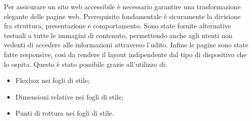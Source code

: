 Per assicurare un sito web accessibile è necessario garantire una trasformazione elegante delle pagine web. Prerequisito fondamentale è sicuramente la divisione fra struttura, presentazione e comportamento. Sono state fornite alternative testuali a tutte le immagini di contenuto, permettendo anche agli utenti non vedenti di accedere alle informazioni attraverso l'udito. 
Infine le pagine sono state fatte responsive, così da rendere il layout indipendente dal tipo di dispositivo che lo ospita. Questo è stato possibile grazie all'utilizzo di:
\begin{itemize}
\item Flexbox nei fogli di stile;
\item Dimensioni relative nei fogli di stile;
\item Punti di rottura nei fogli di stile.
\end{itemize}